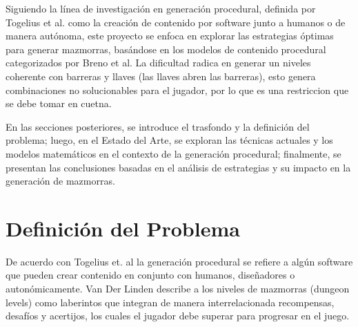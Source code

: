 \documentclass[letter, 10pt]{article}
\begin{document}
Siguiendo la l\'inea de investigaci\'on en generaci\'on procedural, definida por Togelius et al. \cite{togelius2014procedural} como la creaci\'on de contenido por software junto a humanos o de manera aut\'onoma, este proyecto se enfoca en explorar las estrategias \'optimas para generar mazmorras, bas\'andose en los modelos de contenido procedural categorizados por Breno et al. \cite{viana2019PDG} La dificultad radica en generar un niveles coherente con barreras y llaves (las llaves abren las barreras), esto genera combinaciones no solucionables para el jugador, por lo que es una restriccion que se debe tomar en cuetna.

En las secciones posteriores, se introduce el trasfondo y la definici\'on del problema; luego, en el Estado del Arte, se exploran las t\'ecnicas actuales y los modelos matem\'aticos en el contexto de la generaci\'on procedural; finalmente, se presentan las conclusiones basadas en el an\'alisis de estrategias y su impacto en la generaci\'on de mazmorras.

\section{Definici\'on del Problema}

De acuerdo con Togelius et. al \cite{togelius2014procedural} la generaci\'on procedural se refiere a alg\'un software que pueden crear contenido en conjunto con humanos, dise\~nadores o auton\'omicamente. Van Der Linden \cite{van2013procedural} describe a los niveles de mazmorras (dungeon levels) como laberintos que integran de manera interrelacionada recompensas, desaf\'ios y acertijos, los cuales el jugador debe superar para progresar en el juego.
\end{document}
